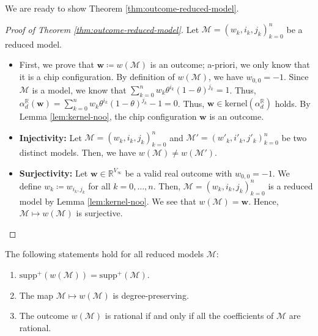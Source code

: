 We are ready to show Theorem \ref{thm:outcome-reduced-model}.

\begin{proof}[Proof of Theorem \ref{thm:outcome-reduced-model}]
    Let \( \mathcal{M} = (w_k,i_k,j_k)_{k=0}^n \) be a reduced model. 

    \begin{itemize}
        \item First, we prove that \( \mathbf w \coloneqq w(\mathcal{M}) \) is an outcome; a-priori, we only know that it is a chip configuration. By definition of \( w(\mathcal{M}) \), we have \( w_{0,0} = -1 \). Since \( \mathcal{M} \) is a model, we know that \( \sum_{k=0}^n w_k \theta^{i_k} (1-\theta)^{j_k} = 1 \). Thus, \( \alpha_d^{\mathbb R}(\mathbf w) = \sum_{k=0}^n w_k \theta^{i_k} (1-\theta)^{j_k} -1 = 0 \). Thus, \( \mathbf{w} \in \mathrm{kernel}(\alpha_d^{\mathbb R}) \) holds. By Lemma \ref{lem:kernel-noo}, the chip configuration \( \mathbf w \) is an outcome.
        
        \item \textbf{Injectivity:} Let \( \mathcal{M} = (w_k,i_k,j_k)^n_{k=0} \) and \( \mathcal{M}' = (w'_k,i'_k,j'_k)^n_{k=0} \) be two distinct models. Then, we have \( w(\mathcal{M}) \neq w(\mathcal{M}') \).
        
        \item \textbf{Surjectivity:} Let \( \mathbf w \in \mathbb{R}^{V_\infty} \) be a valid real outcome with \( w_{0,0} = -1 \). We define \( w_k \coloneqq w_{i_k,j_k}  \) for all \( k = 0, \dots, n \).
        Then, \( \mathcal{M}= (w_k,i_k,j_k)^n_{k=0} \) is a reduced model by Lemma \ref{lem:kernel-noo}. We see that \( w(\mathcal{M}) = \mathbf w \). Hence, \( \mathcal{M} \mapsto w(\mathcal{M}) \) is surjective.
    \end{itemize}
\end{proof}

\begin{proposition}\label{prop:outcome-properties-bllaio}
    The following statements hold for all reduced models \( \mathcal{M} \):
    \begin{enumerate}
        \item \( \mathrm{supp}^+(w(\mathcal{M})) = \mathrm{supp}^+(\mathcal{M})\).
        \item The map \( \mathcal{M} \mapsto w(\mathcal{M}) \) is degree-preserving.
        \item The outcome \( w(\mathcal{M}) \) is rational if and only if all the coefficients of \( \mathcal{M} \) are rational.
    \end{enumerate}
\end{proposition}


